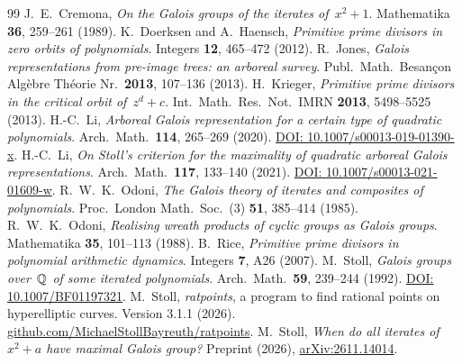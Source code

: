 \begin{thebibliography}{99}
    J.~E.~Cremona, \emph{On the Galois groups of the iterates of~$x^2 + 1$}.
    Mathematika \textbf{36}, 259--261 (1989).
    K.~Doerksen and A.~Haensch, \emph{Primitive prime divisors in zero orbits of polynomials}.
    Integers \textbf{12}, 465--472 (2012).
    R.~Jones, \emph{Galois representations from pre-image trees: an arboreal survey}.
    Publ.\ Math.\ Besan\c{c}on Alg\`ebre Th\'eorie Nr.\ \textbf{2013}, 107--136 (2013).
    H.~Krieger, \emph{Primitive prime divisors in the critical orbit of~$z^d + c$}.
    Int.\ Math.\ Res.\ Not.\ IMRN \textbf{2013}, 5498--5525 (2013).
    H.-C.~Li, \emph{Arboreal Galois representation for a certain type of quadratic polynomials}.
    Arch.\ Math.\ \textbf{114}, 265--269 (2020).
    \href{https://doi.org/10.1007/s00013-019-01390-x}{DOI: 10.1007/s00013-019-01390-x}.
    H.-C.~Li, \emph{On Stoll's criterion for the maximality of quadratic arboreal Galois
    representations}. Arch.\ Math.\ \textbf{117}, 133--140 (2021).
    \href{https://doi.org/10.1007/s00013-021-01609-w}{DOI: 10.1007/s00013-021-01609-w}.
    R.~W.~K.~Odoni, \emph{The Galois theory of iterates and composites of polynomials}.
    Proc.\ London Math.\ Soc.\ (3) \textbf{51}, 385--414 (1985).
    R.~W.~K.~Odoni, \emph{Realising wreath products of cyclic groups as Galois groups}.
    Mathematika \textbf{35}, 101--113 (1988).
    B.~Rice, \emph{Primitive prime divisors in polynomial arithmetic dynamics}.
    Integers \textbf{7}, A26 (2007).
    M.~Stoll, \emph{Galois groups over~$\mathbb{Q}$ of some iterated polynomials}.
    Arch.\ Math.\ \textbf{59}, 239--244 (1992).
    \href{https://doi.org/10.1007/BF01197321}{DOI: 10.1007/BF01197321}.
    M.~Stoll, \emph{ratpoints}, a program to find rational points on hyperelliptic curves.
    Version 3.1.1 (2026).
    \href{https://github.com/MichaelStollBayreuth/ratpoints}{github.com/MichaelStollBayreuth/ratpoints}.
    M.~Stoll, \emph{When do all iterates of~$x^2 + a$ have maximal Galois group?} Preprint (2026),
    \href{https://arxiv.org/abs/2611.14014}{arXiv:2611.14014}.
\end{thebibliography}
